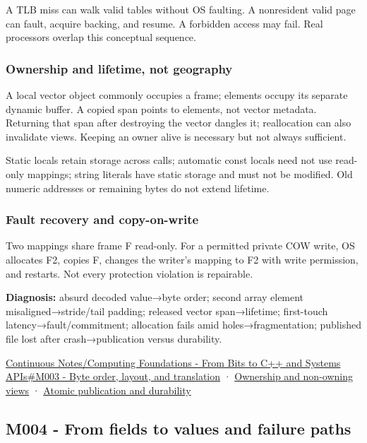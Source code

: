 A TLB miss can walk valid tables without OS faulting. A nonresident valid page can fault, acquire backing, and resume. A forbidden access may fail. Real processors overlap this conceptual sequence.

\subsubsection{Ownership and lifetime, not geography}\label{appendix-92ff77d4dfdc-ownership-and-lifetime-not-geography}

A local vector object commonly occupies a frame; elements occupy its separate dynamic buffer. A copied span points to elements, not vector metadata. Returning that span after destroying the vector dangles it; reallocation can also invalidate views. Keeping an owner alive is necessary but not always sufficient.

Static locals retain storage across calls; automatic const locals need not use read-only mappings; string literals have static storage and must not be modified. Old numeric addresses or remaining bytes do not extend lifetime.

\subsubsection{Fault recovery and copy-on-write}\label{appendix-92ff77d4dfdc-fault-recovery-and-copy-on-write}

Two mappings share frame F read-only. For a permitted private COW write, OS allocates F2, copies F, changes the writer's mapping to F2 with write permission, and restarts. Not every protection violation is repairable.

\textbf{Diagnosis:} absurd decoded value→byte order; second array element misaligned→stride/tail padding; released vector span→lifetime; first-touch latency→fault/commitment; allocation fails amid holes→fragmentation; published file lost after crash→publication versus durability.

\hyperref[01-foundations-i-ch011-m003---byte-order-layout-and-translation]{Continuous Notes/Computing Foundations - From Bits to C++ and Systems APIs\#M003 - Byte order, layout, and translation} · \hyperref[appendix-d52e4486f527]{Ownership and non-owning views} · \hyperref[appendix-e89a8f290ef5]{Atomic publication and durability}

\subsection{M004 - From fields to values and failure paths}\label{appendix-92ff77d4dfdc-m004---from-fields-to-values-and-failure-paths}

